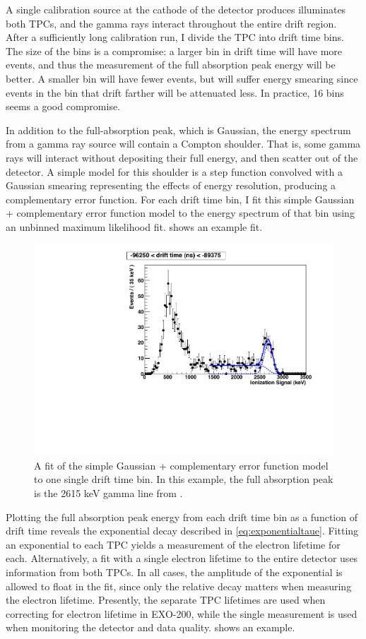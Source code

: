 \documentclass[herrin-thesis.tex]{subfiles}
\begin{document}
A single calibration source at the cathode of the detector produces illuminates both TPCs, and the gamma rays interact throughout the entire drift region. After a sufficiently long calibration run, I divide the TPC into drift time bins. The size of the bins is a compromise: a larger bin in drift time will have more events, and thus the measurement of the full absorption peak energy will be better. A smaller bin will have fewer events, but will suffer energy smearing since events in the bin that drift farther will be attenuated less. In practice, 16  bins seems a good compromise.

In addition to the full-absorption peak, which is Gaussian, the energy spectrum from a gamma ray source will contain a Compton shoulder. That is, some gamma rays will interact without depositing their full energy, and then scatter out of the detector. A simple model for this shoulder is a step function convolved with a Gaussian smearing representing the effects of energy resolution, producing a complementary error function. For each drift time bin, I fit this simple Gaussian + complementary error function model to the energy spectrum of that bin using an unbinned maximum likelihood fit.  shows an example fit.

\begin{figure}[htbp]
\centering
\includegraphics[width=0.8\columnwidth]{./plots/el_run4034_dt_bin_fit.pdf}
\caption[An example fit in a drift time bin]{A fit of the simple Gaussian + complementary error function model to one single drift time bin. In this example, the full absorption peak is the 2615 keV gamma line from .}
\label{fig:dtbinfit}
\end{figure}

Plotting the full absorption peak energy from each drift time bin as a function of drift time reveals the exponential decay described in \cref{eq:exponentialtaue}. Fitting an exponential to each TPC yields a measurement of the electron lifetime for each. Alternatively, a fit with a single electron lifetime to the entire detector uses information from both TPCs. In all cases, the amplitude of the exponential is allowed to float in the fit, since only the relative decay matters when measuring the electron lifetime. Presently, the separate TPC lifetimes are used when correcting for electron lifetime in EXO-200, while the single measurement is used when monitoring the detector and data quality.  shows an example.
\end{document}
